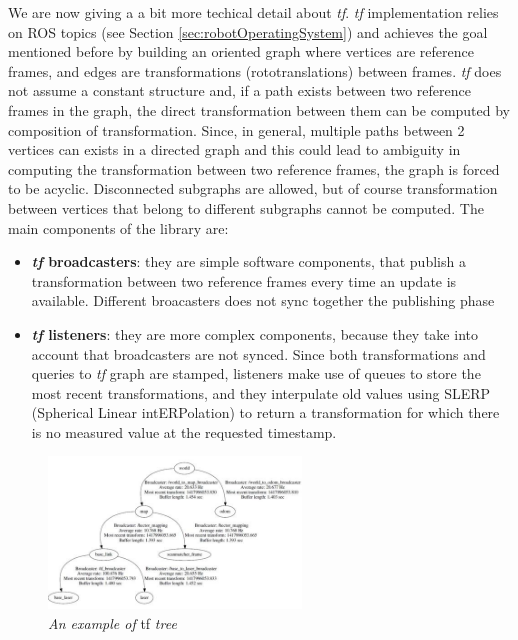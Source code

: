 We are now giving a a bit more techical detail about \textit{tf}.
\textit{tf} implementation relies on \ac{ROS} topics (see Section \ref{sec:robotOperatingSystem}) and achieves the goal mentioned before by building an oriented graph where vertices are reference frames, and edges are transformations (rototranslations) between frames. \textit{tf} does not assume a constant structure and, if a path exists between two reference frames in the graph, the direct transformation between them can be computed by composition of transformation. Since, in general, multiple paths between 2 vertices can exists in a directed graph and this could lead to ambiguity in computing the transformation between two reference frames, the graph is forced to be acyclic. Disconnected subgraphs are allowed, but of course transformation between vertices that belong to different subgraphs cannot be computed. 
The main components of the library are:
\begin{itemize}
	\item \textbf{\textit{tf} broadcasters}: they are simple software components, that publish a transformation between two reference frames every time an update is available. Different broacasters does not sync together the publishing phase
	\item \textbf{\textit{tf} listeners}: they are more complex components, because they take into account that broadcasters are not synced. Since both transformations and queries to \textit{tf} graph are stamped, listeners make use of queues to store the most recent transformations, and they  interpulate old values using SLERP (Spherical Linear intERPolation) to return a transformation for which there is no measured value at the requested timestamp.
\end{itemize}

\begin{figure}
	\centering
	\includegraphics[width=0.6\textwidth]{Images/background_and_tools/tfGraph.JPG}
	\caption{\textit{An example of} tf \textit{tree}}
	\label{fig:tfGraph}
\end{figure}

